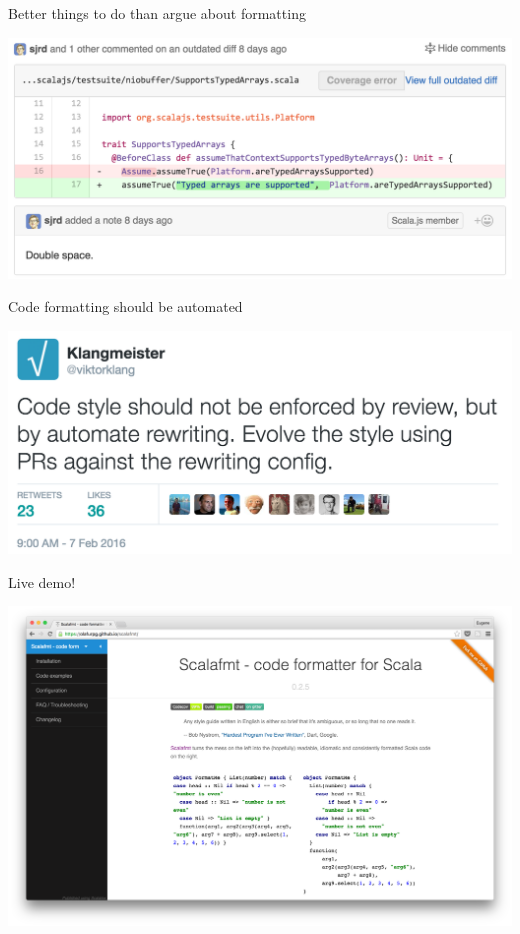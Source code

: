 \documentclass[svgnames,dvipsnames,hyperref={bookmarks=false},usepdftitle=false]{beamer}
\begin{document}

\begin{frame}[c, fragile]{Better things to do than argue about formatting}
\vskip20pt
\begin{center}
\includegraphics[width=0.9\linewidth]{time-sink.png}
\end{center}
\end{frame}

\begin{frame}[c, fragile]{Code formatting should be automated}
\vskip20pt
\begin{center}
\includegraphics[width=0.9\linewidth]{klang.png}
\end{center}
\end{frame}

\begin{frame}[c, fragile]{Live demo!}
\vskip20pt
\begin{center}
\includegraphics[width=0.9\linewidth]{scalafmt.png}
\end{center}
\end{frame}
\end{document}
